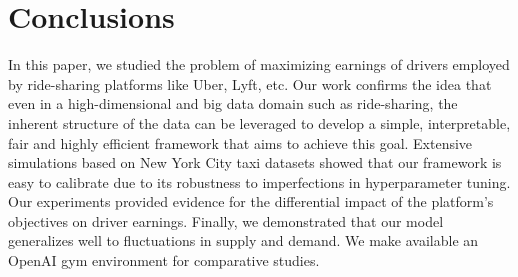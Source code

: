 
\section{Conclusions}
\label{sec:conclusions}

In this paper, we studied the problem of maximizing earnings of 
    drivers employed by ride-sharing platforms like Uber, Lyft, etc. 
Our work confirms the idea that even in a high-dimensional and big data 
    domain such as ride-sharing, the inherent structure of the data can
    be leveraged to develop a simple, interpretable, fair and highly efficient
    framework that aims to achieve this goal.
Extensive simulations based on New York City taxi 
    datasets showed that our framework is easy to calibrate due to its
    robustness to imperfections in hyperparameter tuning.
Our experiments provided evidence for the differential impact of the platform's
    objectives on driver earnings.
Finally, we demonstrated that our model generalizes well to fluctuations 
    in supply and demand.
We make available an OpenAI gym environment for comparative studies.

